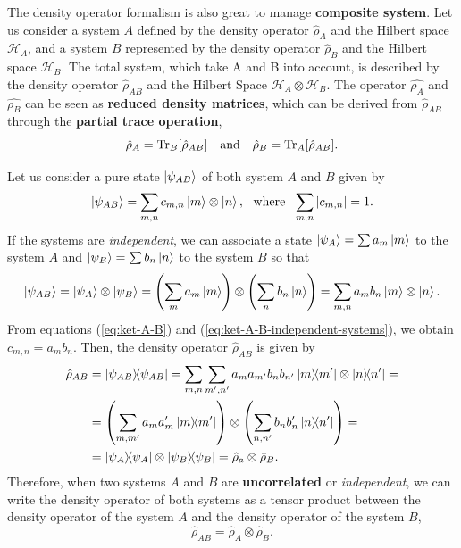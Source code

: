The density operator formalism is also great to manage \textbf{composite system}. Let us consider a system $ A $ defined by the density operator $ \hat{\rho}_A $ and the Hilbert space $ \mathcal{H}_{A} $, and a system $ B $ represented by the density operator $ \hat{\rho}_B $ and the Hilbert space $ \mathcal{H}_B $. The total system, which take A and B into account, is described by the density operator $ \hat{\rho}_{AB} $ and the Hilbert Space $ \mathcal{H}_A \otimes \mathcal{H}_B $. The operator $ \hat{\rho_A} $ and $ \hat{\rho_B} $ can be seen as \textbf{reduced density matrices}, which can be derived from $ \hat{\rho}_{AB} $ through the \textbf{partial trace operation},
\begin{equation}
	\hat{\rho}_A = \Tr_{B} [\hat{\rho}_{AB}]\ \ \ \textrm{and}\ \ \ \hat{\rho}_B = \Tr_A [\hat{\rho}_{AB}].
\end{equation}

Let us consider a pure state $ \ket{\psi_{AB}} $ of both system $ A $ and $ B $ given by
\begin{equation}
	\ket{\psi_{AB}} = \sum_{m,n} c_{m,n} \ket{m} \otimes \ket{n},\ \ \textrm{where}\ \ \sum_{m,n} |c_{m,n}| = 1.
	\label{eq:ket-A-B}
\end{equation}
If the systems are \textit{independent}, we can associate a state $ \ket{\psi_A} = \sum a_m \ket{m} $ to the system $ A $ and $ \ket{\psi_B} = \sum b_n \ket{n} $ to the system $ B $ so that
\begin{equation}
	\ket{\psi_{AB}} = \ket{\psi_A} \otimes \ket{\psi_B} = \left( \sum_m a_m \ket{m} \right) \otimes \left( \sum_n b_n \ket{n} \right) = \sum_{m,n} a_m b_n \ket{m} \otimes \ket{n}.
	\label{eq:ket-A-B-independent-systems}
\end{equation}
From equations (\ref{eq:ket-A-B}) and (\ref{eq:ket-A-B-independent-systems}), we obtain $ c_{m,n} = a_m b_n $. Then, the density operator $ \hat{\rho}_{AB} $ is given by
\begin{align}
	\hat{\rho}_{AB} &= \ketbra{\psi_{AB}}{\psi_{AB}} = \sum_{m,n} \sum_{m',n'} a_{m} a_{m'} b_{n} b_{n'} \ketbra{m}{m'} \otimes \ketbra{n}{n'} = \nonumber\\
	&= \left( \sum_{m,m'} a_m a_m' \ketbra{m}{m'} \right) \otimes \left( \sum_{n,n'} b_n b_n' \ketbra{n}{n'} \right) = \nonumber \\ 
	&= \ketbra{\psi_A}{\psi_A} \otimes \ketbra{\psi_B}{\psi_B} = \hat{\rho}_a \otimes \hat{\rho}_B.
\end{align}
Therefore, when two systems $ A $ and $ B $ are \textbf{uncorrelated} or \textit{independent}, we can write the density operator of both systems as a tensor product between the density operator of the system $A $ and the density operator of the system $ B $,
\begin{equation}
	\hat{\rho}_{AB} = \hat{\rho}_A \otimes \hat{\rho}_B.
\end{equation}


